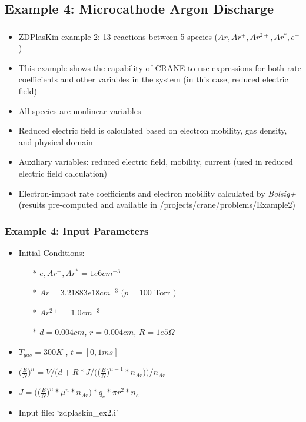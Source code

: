 \subsection{Example 4: Microcathode Argon Discharge} 
\begin{frame}[fragile]
	\frametitle{\insertsubsectionhead}
	\begin{itemize}
		\item ZDPlasKin example 2: 13 reactions between 5 species ($Ar, Ar^+, Ar^{2+}, Ar^*, e^-$) \footnotemark
		\item This example shows the capability of CRANE to use expressions for both rate coefficients and other variables in the system (in this case, reduced electric field)
		\item All species are nonlinear variables
		\item Reduced electric field is calculated based on electron mobility, gas density, and physical domain
		\item Auxiliary variables: reduced electric field, mobility, current (used in reduced electric field calculation)
		\item Electron-impact rate coefficients and electron mobility calculated by \textit{Bolsig+} (results pre-computed and available in /projects/crane/problems/Example2)
	\end{itemize}
\end{frame}




\begin{frame}[fragile]
	\frametitle{Example 4: Input Parameters}
	\begin{itemize}
		\item Initial Conditions:
		\begin{itemize}
			\item[$\ast$] $e, Ar^+, Ar^*= 1e6 cm^{-3}$
			\item[$\ast$]  $Ar = 3.21883e18 cm^{-3}$ $(p = 100$ Torr $)$
			\item[$\ast$]  $Ar^{2+} = 1.0 cm^{-3}$
			\item[$\ast$] $d = 0.004 cm$, $r = 0.004 cm$, $R = 1e5 \Omega$
		\end{itemize}
		\item $T_{gas} = 300 K$ , $t=[0,1 ms]$
		\item $\Big(\tfrac{E}{N}\Big)^n = V / \Big(d + R*J/\Big(\Big(\tfrac{E}{N}\Big)^{n-1}*n_{Ar}\Big)\Big)/n_{Ar}$
		\item $J = \Big(\Big(\tfrac{E}{N}\Big)^n * \mu^n * n_{Ar}\Big) * q_e * \pi r^2 * n_e$
		\item Input file: `zdplaskin\_ex2.i'
	\end{itemize}
\end{frame}

